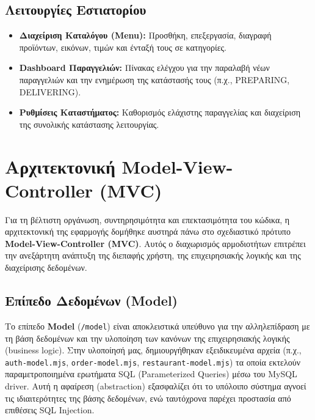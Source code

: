 \documentclass[acmsmall,screen,nonacm]{acmart}
\begin{document}
	\subsection{Λειτουργίες Εστιατορίου}
	\begin{itemize}
		\item \textbf{Διαχείριση Καταλόγου (Menu):} Προσθήκη, επεξεργασία, διαγραφή προϊόντων, εικόνων, τιμών και ένταξή τους σε κατηγορίες.
		\item \textbf{Dashboard Παραγγελιών:} Πίνακας ελέγχου για την παραλαβή νέων παραγγελιών και την ενημέρωση της κατάστασής τους (π.χ., PREPARING, DELIVERING).
		\item \textbf{Ρυθμίσεις Καταστήματος:} Καθορισμός ελάχιστης παραγγελίας και διαχείριση της συνολικής κατάστασης λειτουργίας.
	\end{itemize}

	\section{Αρχιτεκτονική Model-View-Controller (MVC)}
	Για τη βέλτιστη οργάνωση, συντηρησιμότητα και επεκτασιμότητα του κώδικα, η αρχιτεκτονική της εφαρμογής δομήθηκε αυστηρά πάνω στο σχεδιαστικό πρότυπο \textbf{Model-View-Controller (MVC)}. Αυτός ο διαχωρισμός αρμοδιοτήτων επιτρέπει την ανεξάρτητη ανάπτυξη της διεπαφής χρήστη, της επιχειρησιακής λογικής και της διαχείρισης δεδομένων.
	
	\subsection{Επίπεδο Δεδομένων (Model)}
	Το επίπεδο \textbf{Model} (\texttt{/model}) είναι αποκλειστικά υπεύθυνο για την αλληλεπίδραση με τη βάση δεδομένων και την υλοποίηση των κανόνων της επιχειρησιακής λογικής (business logic).
	Στην υλοποίησή μας, δημιουργήθηκαν εξειδικευμένα αρχεία (π.χ., \texttt{auth-model.mjs}, \texttt{order-model.mjs}, \texttt{restaurant-model.mjs}) τα οποία εκτελούν παραμετροποιημένα ερωτήματα SQL (Parameterized Queries) μέσω του MySQL driver. Αυτή η αφαίρεση (abstraction) εξασφαλίζει ότι το υπόλοιπο σύστημα αγνοεί τις ιδιαιτερότητες της βάσης δεδομένων, ενώ ταυτόχρονα παρέχει προστασία από επιθέσεις SQL Injection.
	
\end{document}
